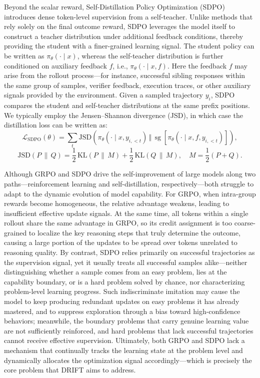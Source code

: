 \documentclass{article}
\begin{document}
Beyond the scalar reward, Self-Distillation Policy Optimization (SDPO) introduces dense token-level supervision from a self-teacher. Unlike methods that rely solely on the final outcome reward, SDPO leverages the model itself to construct a teacher distribution under additional feedback conditions, thereby providing the student with a finer-grained learning signal. The student policy can be written as $\pi_\theta(\cdot\mid x)$, whereas the self-teacher distribution is further conditioned on auxiliary feedback $f$, i.e., $\pi_\theta(\cdot\mid x,f)$. Here the feedback $f$ may arise from the rollout process---for instance, successful sibling responses within the same group of samples, verifier feedback, execution traces, or other auxiliary signals provided by the environment. Given a sampled trajectory $y_i$, SDPO compares the student and self-teacher distributions at the same prefix positions. We typically employ the Jensen--Shannon divergence (JSD), in which case the distillation loss can be written as:
\begin{equation}
\label{eq:sdpo}
\mathcal{L}_{\mathrm{SDPO}}(\theta)=\sum_t \mathrm{JSD}\left(\pi_\theta(\cdot\mid x,y_{i,<t})\,\big\Vert\, \operatorname{sg}\left[\pi_\theta(\cdot\mid x,f,y_{i,<t})\right]\right),
\end{equation}
\begin{equation}
\label{eq:jsd}
\mathrm{JSD}(P \,\|\, Q)= \frac{1}{2}\,\mathrm{KL}(P \,\|\, M)+ \frac{1}{2}\,\mathrm{KL}(Q \,\|\, M),\quad M = \frac{1}{2}(P+Q).
\end{equation}

Although GRPO and SDPO drive the self-improvement of large models along two paths---reinforcement learning and self-distillation, respectively---both struggle to adapt to the dynamic evolution of model capability. For GRPO, when intra-group rewards become homogeneous, the relative advantage weakens, leading to insufficient effective update signals. At the same time, all tokens within a single rollout share the same advantage in GRPO, so its credit assignment is too coarse-grained to localize the key reasoning steps that truly determine the outcome, causing a large portion of the updates to be spread over tokens unrelated to reasoning quality. By contrast, SDPO relies primarily on successful trajectories as the supervision signal, yet it usually treats all successful samples alike---neither distinguishing whether a sample comes from an easy problem, lies at the capability boundary, or is a hard problem solved by chance, nor characterizing problem-level learning progress. Such indiscriminate imitation may cause the model to keep producing redundant updates on easy problems it has already mastered, and to suppress exploration through a bias toward high-confidence behaviors; meanwhile, the boundary problems that carry genuine learning value are not sufficiently reinforced, and hard problems that lack successful trajectories cannot receive effective supervision. Ultimately, both GRPO and SDPO lack a mechanism that continually tracks the learning state at the problem level and dynamically allocates the optimization signal accordingly---which is precisely the core problem that DRIFT aims to address.
\end{document}
